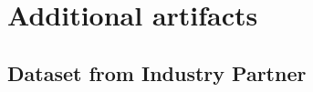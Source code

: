 %
%
%

\appendix

\chapter{Additional artifacts}
\label{introA} %

\section{Dataset from Industry Partner}
\label{sec:dataset-sdm}

